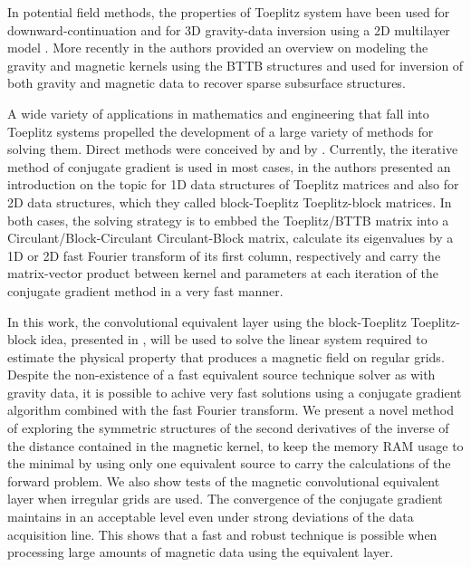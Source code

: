 In potential field methods, the properties of Toeplitz system have been used for downward-continuation \citep{zhang-etal2016} and for 3D gravity-data inversion using a 2D multilayer model \citep{zhang-wong2015}. More recently in \cite{hogue2020tutorial} the authors provided an overview on modeling the gravity and magnetic kernels using the BTTB structures and \cite{renaut2020fast} used for inversion of both gravity and magnetic data to recover sparse subsurface structures.

A wide variety of applications in mathematics and engineering that fall into Toeplitz systems propelled the development of a large variety of  methods for solving them. Direct methods were conceived by \cite{levinson1946} and by \cite{trench1964}. Currently, the iterative method of conjugate gradient is used in most cases, in \cite{chan-jin2007} the authors presented an introduction on the topic for 1D data structures of Toeplitz matrices and also for 2D data structures, which they called block-Toeplitz Toeplitz-block matrices. In both cases, the solving strategy is to embbed the Toeplitz/BTTB matrix into a Circulant/Block-Circulant Circulant-Block matrix, calculate its eigenvalues by a 1D or 2D fast Fourier transform of its first column, respectively and carry the matrix-vector product between kernel and parameters at each iteration of the conjugate gradient method in a very fast manner.

In this work, the convolutional equivalent layer using the block-Toeplitz Toeplitz-block idea, presented in \cite{takahashi2020convolutional}, will be used to solve the linear system required to estimate the physical property that produces a magnetic field on regular grids. Despite the non-existence of a fast equivalent source technique solver as with gravity data, it is possible to achive very fast solutions using a conjugate gradient algorithm combined with the fast Fourier transform. We present a novel method of exploring the symmetric structures of the second derivatives of the inverse of the distance contained in the magnetic kernel, to keep the memory RAM usage to the minimal by using only one equivalent source to carry the calculations of the forward problem. We also show tests of the magnetic convolutional equivalent layer when irregular grids are used. The convergence of the conjugate gradient maintains in an acceptable level even under strong deviations of the data acquisition line. This shows that a fast and robust technique is possible when processing large amounts of magnetic data using the equivalent layer.